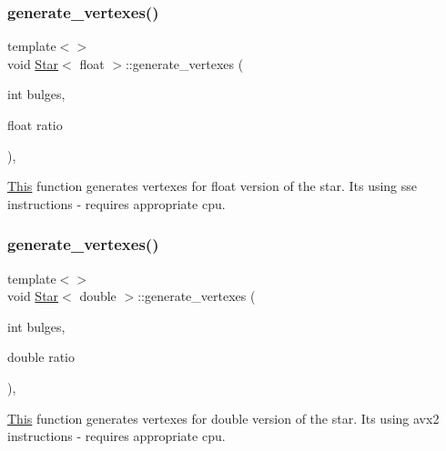 \subsubsection{\texorpdfstring{generate\+\_\+vertexes()}{generate\_vertexes()}\hspace{0.1cm}{\footnotesize\ttfamily [2/3]}}
{\footnotesize\ttfamily template$<$$>$ \\
void \mbox{\hyperlink{classStar}{Star}}$<$ float $>$\+::generate\+\_\+vertexes (\begin{DoxyParamCaption}\item[{int}]{bulges,  }\item[{float}]{ratio }\end{DoxyParamCaption})\hspace{0.3cm}{\ttfamily [inline]}, {\ttfamily [private]}}



\mbox{\hyperlink{classThis}{This}} function generates vertexes for float version of the star. It\textquotesingle{}s using sse instructions -\/ requires appropriate cpu. 

\mbox{\label{classStar_a85d8438cea72701a136b76f046ee95dd}} 
\subsubsection{\texorpdfstring{generate\+\_\+vertexes()}{generate\_vertexes()}\hspace{0.1cm}{\footnotesize\ttfamily [3/3]}}
{\footnotesize\ttfamily template$<$$>$ \\
void \mbox{\hyperlink{classStar}{Star}}$<$ double $>$\+::generate\+\_\+vertexes (\begin{DoxyParamCaption}\item[{int}]{bulges,  }\item[{double}]{ratio }\end{DoxyParamCaption})\hspace{0.3cm}{\ttfamily [inline]}, {\ttfamily [private]}}



\mbox{\hyperlink{classThis}{This}} function generates vertexes for double version of the star. It\textquotesingle{}s using avx2 instructions -\/ requires appropriate cpu. 

\mbox{\label{classStar_a7113d2808314f0aa2f5a87325f8c535d}} 
